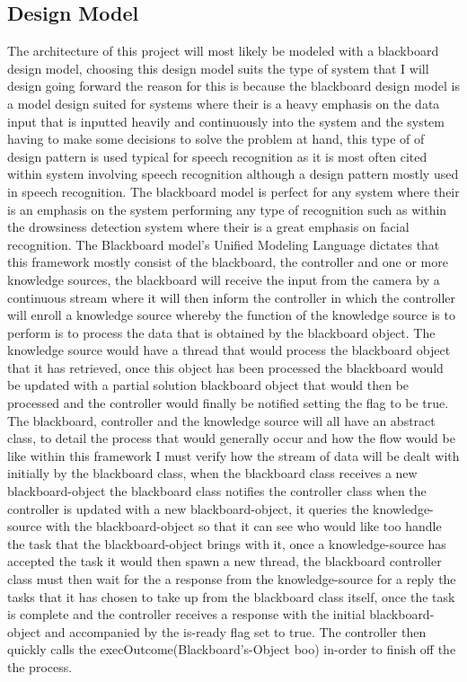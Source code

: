 \subsection{Design Model}
The architecture of this project will most likely be modeled with a blackboard design model, choosing this design model suits the type of system that I will design going forward the reason for this is because the blackboard design model is a model design suited for systems where their is a heavy emphasis on the data input that is inputted heavily and continuously into the
system and the system having to make some decisions to solve the problem at hand, this type of of design pattern is used typical for speech recognition as it is most often cited within system involving speech recognition although a design pattern mostly used in speech recognition. The blackboard model is perfect for any system where their is an emphasis on the system performing any type of recognition such as within the drowsiness detection system where their is a great emphasis on facial recognition. The Blackboard model's Unified Modeling Language dictates that this framework mostly consist of the blackboard, the controller and one or more knowledge sources, the blackboard will receive the input from the camera by a continuous stream where it will then inform the controller in which the controller will enroll a knowledge source whereby the function of the knowledge source is to perform is to process the data that is obtained by the blackboard object. The knowledge source would have a thread that would process the blackboard object that it has retrieved, once this object has been processed the blackboard would be updated with a partial solution blackboard object that would then be processed and the controller would finally be notified setting the flag to be true. The blackboard, controller and the knowledge source will all have an abstract class, to detail the process that would generally occur and how the flow would be like within this framework I must verify how the stream of data will be dealt with initially by the blackboard class, when the blackboard class receives a new blackboard-object the blackboard class notifies the controller class when the controller is updated with a new blackboard-object, it queries the knowledge-source with the blackboard-object so that it can see who would like too handle the task that the blackboard-object brings with it, once a knowledge-source has accepted the task it would then spawn a new thread, the blackboard controller class must then wait for the a response from the knowledge-source for a reply the tasks that it has chosen to take up from the blackboard class itself, once the task is complete and the controller receives a response with the initial blackboard-object and accompanied by the is-ready flag set to true. The controller then quickly calls the execOutcome(Blackboard's-Object boo) in-order to finish off the the process.

